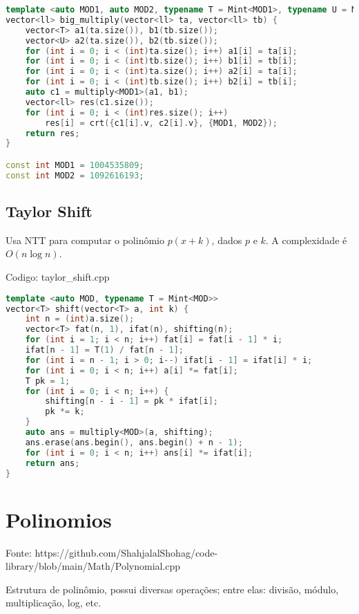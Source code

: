 \documentclass[10pt, a4paper, oneside]{book}
\begin{document}
\begin{lstlisting}[language=C++]
template <auto MOD1, auto MOD2, typename T = Mint<MOD1>, typename U = Mint<MOD2>>
vector<ll> big_multiply(vector<ll> ta, vector<ll> tb) {
    vector<T> a1(ta.size()), b1(tb.size());
    vector<U> a2(ta.size()), b2(tb.size());
    for (int i = 0; i < (int)ta.size(); i++) a1[i] = ta[i];
    for (int i = 0; i < (int)tb.size(); i++) b1[i] = tb[i];
    for (int i = 0; i < (int)ta.size(); i++) a2[i] = ta[i];
    for (int i = 0; i < (int)tb.size(); i++) b2[i] = tb[i];
    auto c1 = multiply<MOD1>(a1, b1);
    vector<ll> res(c1.size());
    for (int i = 0; i < (int)res.size(); i++)
        res[i] = crt({c1[i].v, c2[i].v}, {MOD1, MOD2});
    return res;
}

const int MOD1 = 1004535809;
const int MOD2 = 1092616193;\end{lstlisting}
\hfill

\subsection{Taylor Shift}


Usa NTT para computar o polinômio $p(x + k)$, dados $p$ e $k$. A complexidade é $O(n \log n)$.
\hfill

Codigo: taylor\_shift.cpp

\begin{lstlisting}[language=C++]
template <auto MOD, typename T = Mint<MOD>>
vector<T> shift(vector<T> a, int k) {
    int n = (int)a.size();
    vector<T> fat(n, 1), ifat(n), shifting(n);
    for (int i = 1; i < n; i++) fat[i] = fat[i - 1] * i;
    ifat[n - 1] = T(1) / fat[n - 1];
    for (int i = n - 1; i > 0; i--) ifat[i - 1] = ifat[i] * i;
    for (int i = 0; i < n; i++) a[i] *= fat[i];
    T pk = 1;
    for (int i = 0; i < n; i++) {
        shifting[n - i - 1] = pk * ifat[i];
        pk *= k;
    }
    auto ans = multiply<MOD>(a, shifting);
    ans.erase(ans.begin(), ans.begin() + n - 1);
    for (int i = 0; i < n; i++) ans[i] *= ifat[i];
    return ans;
}\end{lstlisting}
\hfill

\section{Polinomios}


Fonte: https://github.com/ShahjalalShohag/code-library/blob/main/Math/Polynomial.cpp



Estrutura de polinômio, possui diversas operações; entre elas: divisão, módulo, multiplicação, log, etc. 
\end{document}
